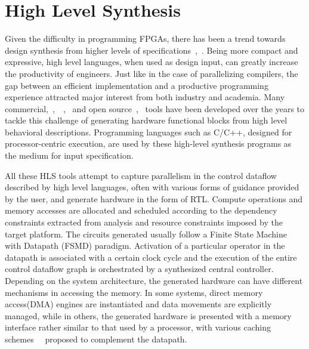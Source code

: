 \section{High Level Synthesis} 
\label{chap1:hls}
Given the difficulty in programming FPGAs, there has
been a trend towards design synthesis from higher levels of
specifications~\cite{Coussy:2008:HSA:1457713},~\cite{intro2hls}. Being more compact and expressive, high level
languages, when used as design input, can greatly increase the
productivity of engineers. Just like in the case of parallelizing compilers, the gap between
an efficient implementation and a productive programming experience attracted major interest from 
both industry and academia. Many commercial,~\cite{tools:autoesl},~\cite{tools:catapultc}~\cite{tools:alterac2h},~\cite{tools:vivadohls} and open source~\cite{tools:legup},~\cite{tools:roccc} tools have been developed over the years 
to tackle this challenge of generating hardware functional blocks from high level
behavioral descriptions. Programming languages such as C/C++, designed for processor-centric execution, are used by these high-level synthesis programs as the medium for input specification. 

All these HLS tools attempt to capture parallelism in the control dataflow described by high level languages, often with various forms of guidance provided by the user, and 
generate hardware in the form of RTL.
Compute operations and memory accesses are allocated and scheduled according to the dependency constraints extracted
from analysis and resource constraints imposed by the target platform. The circuits generated usually follow
a Finite State Machine with Datapath (FSMD) paradigm. Activation of a particular operator in the datapath is associated
with a certain clock cycle and the execution of the entire control dataflow graph is orchestrated by 
a synthesized central controller. Depending on the system architecture, the generated hardware can have
different mechanisms in accessing the memory.
In some systems, direct memory access(DMA) engines are instantiated and data movements are explicitly managed, while 
in others, the generated
hardware is presented with a memory interface rather similar to that used by a processor, with various
caching schemes~\cite{6239785}~\cite{6239808} proposed to complement the datapath.

